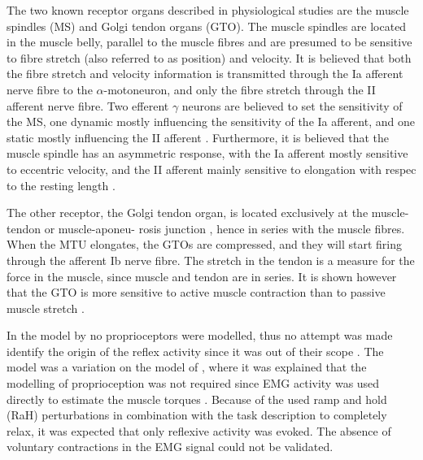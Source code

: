 The two known receptor organs described in physiological studies are the muscle spindles (MS) and Golgi tendon organs (GTO). The muscle spindles are located in the muscle belly, parallel to the muscle fibres and are presumed to be sensitive to fibre stretch (also referred to as position) and velocity. It is believed that both the fibre stretch and velocity information is transmitted through the Ia afferent nerve fibre to the $\alpha$-motoneuron, and only the fibre stretch through the II afferent nerve fibre. Two efferent $\gamma$ neurons are believed to set the sensitivity of the MS, one dynamic mostly influencing the sensitivity of the Ia afferent, and one static mostly influencing the II afferent \cite{mileusnic_mathematical_2006}. Furthermore, it is believed that the muscle spindle has an asymmetric response, with the Ia afferent mostly sensitive to eccentric velocity, and the II afferent mainly sensitive to elongation with respec to the resting length \cite{burke_muscle_1978}. 

The other receptor, the Golgi tendon organ, is located exclusively at the muscle-tendon or muscle-aponeu- rosis junction \cite{jami_golgi_1992}, hence in series with the muscle fibres. When the MTU elongates, the GTOs are compressed, and they will start firing through the afferent Ib nerve fibre. The stretch in the tendon is a measure for the force in the muscle, since muscle and tendon are in series. It is shown however that the GTO is more sensitive to active muscle contraction than to passive muscle stretch \cite{houk_responses_1967}.

In the model by \citeauthor{de_gooijer-van_de_groep_estimation_2016} no proprioceptors were modelled, thus no attempt was made identify the origin of the reflex activity since it was out of their scope \cite{de_gooijer-van_de_groep_estimation_2016}. The model was a variation on the model of \citeauthor{de_vlugt_relation_2010}, where it was explained that the modelling of proprioception was not required since EMG activity was used directly to estimate the muscle torques \cite{de_vlugt_relation_2010}. Because of the used ramp and hold (RaH) perturbations in combination with the task description to completely relax, it was expected that only reflexive activity was evoked. The absence of voluntary contractions in the EMG signal could not be validated. 



